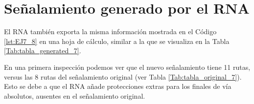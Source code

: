 \section{Señalamiento generado por el RNA}

    El RNA también exporta la misma información mostrada en el Código \ref{lst:EJ7_8} en una hoja de cálculo, similar a la que se visualiza en la Tabla \ref{Tab:tabla_generated_7}.
    
    \begin{table}[H]
        {
        \caption{Tabla de enclavamiento del ejemplo 7 generada por el RNA.}
        \label{Tab:tabla_generated_7}
        \begin{center}      
        \end{center}
     }
    \end{table}
    
    En una primera inspección podemos ver que el nuevo señalamiento tiene 11 rutas, versus las 8 rutas del señalamiento original (ver Tabla \ref{Tab:tabla_original_7}). Esto se debe a que el RNA añade protecciones extras para los finales de vía absolutos, ausentes en el señalamiento original.